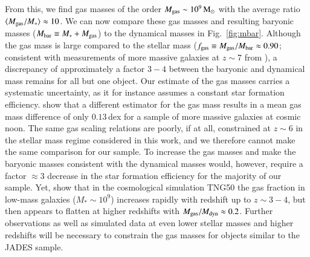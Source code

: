 \documentclass[longauth]{aa}
\newcommand{\Msun}{\rm M_\odot}
\newcommand{\Mdyn}{M_{\rm dyn}}
\newcommand{\Mgas}{M_{\rm gas}}
\newcommand{\Mbar}{M_{\rm bar}}
\begin{document}
From this, we find gas masses of the order $\Mgas \sim 10^9\,\Msun$ with the average ratio $\langle\Mgas/M_*\rangle \approx 10$. We can now compare these gas masses and resulting baryonic masses ($\Mbar \equiv M_*+\Mgas$) to the dynamical masses in Fig.~\ref{fig:mbar}. Although the gas mass is large compared to the stellar mass ($f_{\rm gas} \equiv \Mgas/\Mbar \approx 0.90$; {consistent with measurements of more massive galaxies at $z\sim7$ from \citealt{Heintz2022}}), a discrepancy of approximately a factor $3-4$ between the baryonic and dynamical mass remains for all but one object. Our estimate of the gas masses carries a systematic uncertainty, as it for instance assumes a constant star formation efficiency. %
\citet{Price2020} show that a different estimator for the gas mass \citep[following][]{Tacconi2018} results in a mean gas mass difference of only $0.13\,$dex for a sample of more massive galaxies at cosmic noon. The same gas scaling relations are poorly, if at all, constrained at $z\sim6$ in the stellar mass regime considered in this work, and we therefore cannot make the same comparison for our sample. To increase the gas masses and make the baryonic masses consistent with the dynamical masses would, however, require a factor $\approx3$ decrease in the star formation efficiency for the majority of our sample. Yet, \citet{Pillepich2019} show that in the cosmological simulation TNG50 the gas fraction in low-mass galaxies ($M_*\sim10^9$) increases rapidly with redshift up to $z\sim3-4$, but then appears to flatten at higher redshifts with $\Mgas/\Mdyn \approx 0.2$. Further observations as well as simulated data at even lower stellar masses and higher redshifts will be necessary to constrain the gas masses for objects similar to the JADES sample. 
\end{document}

